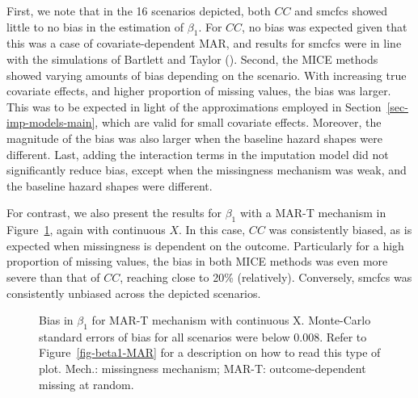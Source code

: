 \documentclass[
  letterpaper,
  DIV=11,
  numbers=noendperiod]{scrreprt}
\begin{document}
First, we note that in the 16 scenarios depicted, both \(CC\) and smcfcs
showed little to no bias in the estimation of \(\beta_1\). For \(CC\),
no bias was expected given that this was a case of covariate-dependent
MAR, and results for smcfcs were in line with the simulations of
Bartlett and Taylor
(). Second,
the MICE methods showed varying amounts of bias depending on the
scenario. With increasing true covariate effects, and higher proportion
of missing values, the bias was larger. This was to be expected in light
of the approximations employed in Section~\ref{sec-imp-models-main},
which are valid for small covariate effects. Moreover, the magnitude of
the bias was also larger when the baseline hazard shapes were different.
Last, adding the interaction terms in the imputation model did not
significantly reduce bias, except when the missingness mechanism was
weak, and the baseline hazard shapes were different.

For contrast, we also present the results for \(\beta_1\) with a MAR-T
mechanism in Figure~\ref{fig-beta1-MAR-T}, again with continuous \(X\).
In this case, \(CC\) was consistently biased, as is expected when
missingness is dependent on the outcome. Particularly for a high
proportion of missing values, the bias in both MICE methods was even
more severe than that of \(CC\), reaching close to 20\% (relatively).
Conversely, smcfcs was consistently unbiased across the depicted
scenarios.

\begin{figure}


\caption{\label{fig-beta1-MAR-T}Bias in \(\beta_1\) for MAR-T mechanism
with continuous X. Monte-Carlo standard errors of bias for all scenarios
were below 0.008. Refer to Figure~\ref{fig-beta1-MAR} for a description
on how to read this type of plot. Mech.: missingness mechanism; MAR-T:
outcome-dependent missing at random.}

\end{figure}%
\end{document}

